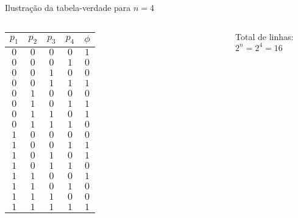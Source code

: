 \expandafter\documentclass\expandafter[table, usenames, svgnames, dvipsnames,14pt, \classopts]{beamer}
\begin{document}
\begin{frame}{Ilustração da tabela-verdade para $n = 4$}
    
    \begin{columns}[c]
    
            \begin{table}
                \scriptsize
                \begin{tabular}{cccc|c}
                    $p_1$ & $p_2$ & $p_3$ & $p_4$ & $\phi$\\
                    \hline
                    \rowcolor{LightCyan}
                    $0$ & $0$ & $0$ & $0$ & $1$\\
                    $0$ & $0$ & $0$ & $1$ & $0$\\
                    $0$ & $0$ & $1$ & $0$ & $0$\\
                    \rowcolor{LightCyan}
                    $0$ & $0$ & $1$ & $1$ & $1$\\
                    $0$ & $1$ & $0$ & $0$ & $0$\\
                    \rowcolor{LightCyan}
                    $0$ & $1$ & $0$ & $1$ & $1$\\
                    \rowcolor{LightCyan}
                    $0$ & $1$ & $1$ & $0$ & $1$\\
                    $0$ & $1$ & $1$ & $1$ & $0$\\
                    $1$ & $0$ & $0$ & $0$ & $0$\\
                    \rowcolor{LightCyan}
                    $1$ & $0$ & $0$ & $1$ & $1$\\
                    \rowcolor{LightCyan}
                    $1$ & $0$ & $1$ & $0$ & $1$\\
                    $1$ & $0$ & $1$ & $1$ & $0$\\
                    \rowcolor{LightCyan}
                    $1$ & $1$ & $0$ & $0$ & $1$\\
                    $1$ & $1$ & $0$ & $1$ & $0$\\
                    $1$ & $1$ & $1$ & $0$ & $0$\\
                    \rowcolor{LightCyan}
                    $1$ & $1$ & $1$ & $1$ & $1$\\
                \end{tabular}
            \end{table}

        
            \begin{outline}
                \small
                \1 Total de linhas: $2^n = 2^4 = 16$
            \end{outline}

    \end{columns}
\end{frame}
\end{document}

